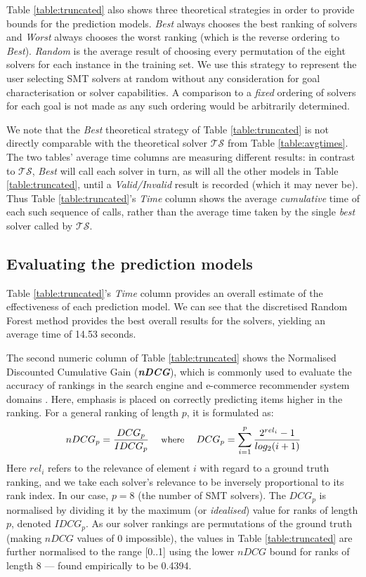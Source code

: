 \documentclass[runningheads,a4paper]{llncs}
\begin{document}
Table \ref{table:truncated} also shows three theoretical strategies in order to provide bounds for the prediction models. \textit{Best} always chooses the best ranking of solvers and \textit{Worst} always chooses the worst ranking (which is the reverse ordering to \textit{Best}). \textit{Random} is the average result of choosing every permutation of the eight solvers for each instance in the training set.  We use this strategy to represent the user selecting SMT solvers at random without any consideration for goal characterisation or solver capabilities. 
A comparison to a \textit{fixed} ordering of solvers for each goal is not made as any such ordering would be arbitrarily determined. 

We note that the \textit{Best} theoretical strategy of Table \ref{table:truncated} is not directly comparable with the theoretical solver $\mathcal{TS}$ from Table \ref{table:avgtimes}.  The two tables' average time columns are measuring different results: in contrast to $\mathcal{TS}$, \textit{Best} will call each solver in turn, as will all the other models in Table \ref{table:truncated}, until a \textit{Valid/Invalid} result is recorded (which it may never be).  Thus Table \ref{table:truncated}'s \textit{Time} column shows the average \textit{cumulative} time of each such sequence of calls, rather than the average time taken by the single \textit{best} solver called by $\mathcal{TS}$. 

\subsection{Evaluating the prediction models}

Table \ref{table:truncated}'s \textit{Time} column provides an overall estimate of the effectiveness of each prediction model.  We can see that the discretised Random Forest method provides the best overall results for the solvers, yielding an average time of 14.53 seconds.

The second numeric column of Table \ref{table:truncated} shows the 
Normalised Discounted Cumulative Gain (\textit{\textbf{nDCG}}), which is commonly used to evaluate the accuracy of rankings in the search engine and e-commerce recommender system domains \cite{NDCG}. Here, emphasis is placed on correctly predicting items higher in the ranking. For a general ranking of length $p$, it is formulated as:
\[\small
	nDCG_p = \frac{DCG_p}{IDCG_p}
    \quad\text{ where }\quad
    DCG_p = \sum_{i=1}^{p} \frac{2^{rel_i} - 1}{log_2(i+1)}
\]
Here $rel_i$ refers to the relevance of element $i$ with regard to a ground truth ranking, and we take each solver's relevance to be inversely proportional to its rank index.  In our case, $p = 8$ (the number of SMT solvers).  The $DCG_p$ is normalised by dividing it by the maximum (or \textit{idealised}) value for ranks of length $p$, denoted $IDCG_p$. As our solver rankings are permutations of the ground truth (making $nDCG$ values of 0 impossible), the values in Table \ref{table:truncated} are further normalised to the range [0..1] using the lower $nDCG$ bound for ranks of length 8 --- found empirically to be 0.4394. 
\end{document}
